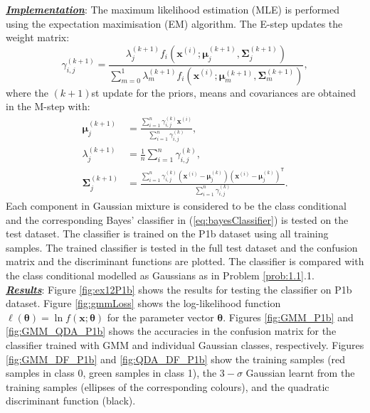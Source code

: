 \documentclass[12pt, a4 paper]{article}
\newcommand{\bx}{\mathbf{x}}
\newcommand{\TT}{\mathsf{T}}
\newcommand{\bmu}{\boldsymbol{\mu}}
\newcommand{\btheta}{\boldsymbol{\theta}}
\newcommand{\bSigma}{\boldsymbol{\Sigma}}
\begin{document}
\underline {\it \bfseries Implementation}: The maximum likelihood estimation (MLE) is performed using the expectation maximisation (EM) algorithm. The E-step updates the weight matrix:
\begin{equation}
	\gamma_{i,j}^{(k+1)} = \frac{\lambda_{j}^{(k+1)} f_{i}(\bx^{(i)}; \bmu_{j}^{(k+1)}, \bSigma_{j}^{{(k+1)}})}{\sum_{m=0}^{1} \lambda_{m}^{(k+1)} f_{i}(\bx^{(i)}; \bmu_{m}^{(k+1)}, \bSigma_{m}^{(k+1)})},
\label{eq:estep}
\end{equation}
where the $(k+1)$st update for the priors, means and covariances are obtained in the M-step with:
\begin{equation}
\begin{split}
	\bmu_{j}^{(k+1)} &= \frac{\sum_{i=1}^{n} \gamma^{(k)}_{i,j} \bx^{(i)}}{\sum_{i=1}^{n} \gamma^{(k)}_{i,j}}, \\
	\lambda_{j}^{(k+1)} &= \frac{1}{n} \sum_{i=1}^{n} \gamma^{(k)}_{i,j}, \\
	\bSigma_{j}^{(k+1)} &= \frac{\sum_{i=1}^{n} \gamma^{(k)}_{i,j} (\bx^{(i)} - \bmu_{j}^{(k)})(\bx^{(i)} - \bmu_{j}^{(k)})^{\TT}}{\sum_{i=1}^{n} \gamma^{(k)}_{i,j}}.
\end{split}
\label{eq:mstep}
\end{equation}
Each component in Gaussian mixture is considered to be the class conditional and the corresponding Bayes' classifier in (\ref{eq:bayesClassifier}) is tested on the test dataset. The classifier is trained on the P1b dataset using all training samples. The trained classifier is tested in the full test dataset and the confusion matrix and the discriminant functions are plotted. The classifier is compared with the class conditional modelled as Gaussians as in Problem \ref{prob:1.1}.1. \\

\underline {\it \bfseries Results}: Figure \ref{fig:ex12P1b} shows the results for testing the classifier on P1b dataset. Figure \ref{fig:gmmLoss} shows the log-likelihood function $\ell(\btheta) = \ln f(\bx; \btheta)$ for the parameter vector $\btheta$. Figures \ref{fig:GMM_P1b} and \ref{fig:GMM_QDA_P1b} shows the accuracies in the confusion matrix for the classifier trained with GMM and individual Gaussian classes, respectively. Figures \ref{fig:GMM_DF_P1b} and \ref{fig:QDA_DF_P1b} show the training samples (red samples in class 0, green samples in class 1), the $3-\sigma$ Gaussian learnt from the training samples (ellipses of the corresponding colours), and the quadratic discriminant function (black).
\end{document}
